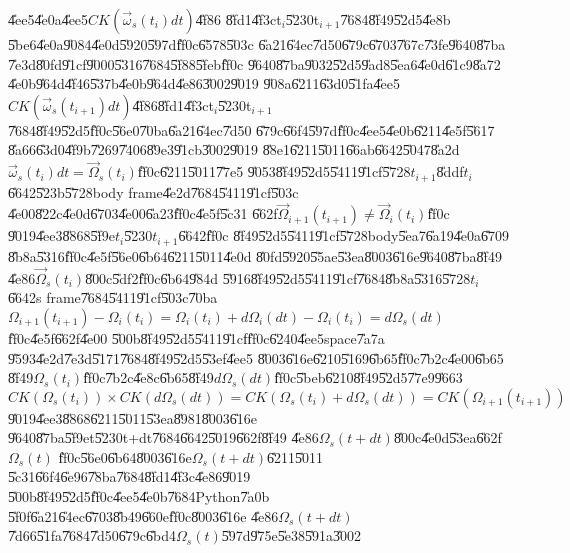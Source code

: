 \documentclass[12pt]{article}
\begin{document}
\U{4ee5}\U{4e0a}\U{4ee5}$CK\left( \vec{\omega}_{s}(t_{i})dt\right) $\U{4f86}%
\U{8fd1}\U{4f3c}t$_{i}$\U{5230}t$_{i+1}$\U{7684}\U{8f49}\U{52d5}\U{4e8b}%
\U{5be6}\U{4e0a}\U{9084}\U{4e0d}\U{5920}\U{597d}\U{ff0c}\U{6578}\U{503c}%
\U{6a21}\U{64ec}\U{7d50}\U{679c}\U{6703}\U{767c}\U{73fe}\U{9640}\U{87ba}%
\U{7e3d}\U{80fd}\U{91cf}\U{9000}\U{5316}\U{7684}\U{5f88}\U{5feb}\U{ff0c}%
\U{9640}\U{87ba}\U{9032}\U{52d5}\U{9ad8}\U{5ea6}\U{4e0d}\U{61c9}\U{8a72}%
\U{4e0b}\U{964d}\U{4f46}\U{537b}\U{4e0b}\U{964d}\U{4e86}\U{3002}\U{9019}%
\U{908a}\U{6211}\U{63d0}\U{51fa}\U{4ee5}$CK\left( \vec{\omega}%
_{s}(t_{i+1})dt\right) $\U{4f86}\U{8fd1}\U{4f3c}t$_{i}$\U{5230}t$_{i+1}$%
\U{7684}\U{8f49}\U{52d5}\U{ff0c}\U{56e0}\U{70ba}\U{6a21}\U{64ec}\U{7d50}%
\U{679c}\U{66f4}\U{597d}\U{ff0c}\U{4ee5}\U{4e0b}\U{6211}\U{4e5f}\U{5617}%
\U{8a66}\U{63d0}\U{4f9b}\U{7269}\U{7406}\U{89e3}\U{91cb}\U{3002}\U{9019}%
\U{88e1}\U{6211}\U{5011}\U{66ab}\U{6642}\U{5047}\U{8a2d}$\vec{\omega}%
_{s}(t_{i})dt=\vec{\Omega}_{s}(t_{i})$\U{ff0c}\U{6211}\U{5011}\U{77e5}%
\U{9053}\U{8f49}\U{52d5}\U{5411}\U{91cf}\U{5728}$t_{i+1}$\U{8ddf}$t_{i}$%
\U{6642}\U{523b}\U{5728}body frame\U{4e2d}\U{7684}\U{5411}\U{91cf}\U{503c}%
\U{4e00}\U{822c}\U{4e0d}\U{6703}\U{4e00}\U{6a23}\U{ff0c}\U{4e5f}\U{5c31}%
\U{662f}$\vec{\Omega}_{i+1}(t_{i+1})\neq \vec{\Omega}_{i}(t_{i})$\U{ff0c}%
\U{9019}\U{4ee3}\U{8868}\U{5f9e}$t_{i}$\U{5230}$t_{i+1}$\U{6642}\U{ff0c}%
\U{8f49}\U{52d5}\U{5411}\U{91cf}\U{5728}body\U{5ea7}\U{6a19}\U{4e0a}\U{6709}%
\U{8b8a}\U{5316}\U{ff0c}\U{4e5f}\U{56e0}\U{6b64}\U{6211}\U{5011}\U{4e0d}%
\U{80fd}\U{5920}\U{55ae}\U{53ea}\U{8003}\U{616e}\U{9640}\U{87ba}\U{8f49}%
\U{4e86}$\vec{\Omega}_{s}(t_{i})$\U{800c}\U{5df2}\U{ff0c}\U{6b64}\U{984d}%
\U{5916}\U{8f49}\U{52d5}\U{5411}\U{91cf}\U{7684}\U{8b8a}\U{5316}\U{5728}$%
t_{i}$\U{6642}s frame\U{7684}\U{5411}\U{91cf}\U{503c}\U{70ba}$\Omega
_{i+1}(t_{i+1})-\Omega _{i}(t_{i})=\Omega _{i}(t_{i})+d\Omega
_{i}(dt)-\Omega _{i}(t_{i})=d\Omega _{s}(dt)$\U{ff0c}\U{4e5f}\U{662f}\U{4e00}%
\U{500b}\U{8f49}\U{52d5}\U{5411}\U{91cf}\U{ff0c}\U{6240}\U{4ee5}space\U{7a7a}%
\U{9593}\U{4e2d}\U{7e3d}\U{5171}\U{7684}\U{8f49}\U{52d5}\U{53ef}\U{4ee5}%
\U{8003}\U{616e}\U{6210}\U{5169}\U{6b65}\U{ff0c}\U{7b2c}\U{4e00}\U{6b65}%
\U{8f49}$\Omega _{s}(t_{i})$\U{ff0c}\U{7b2c}\U{4e8c}\U{6b65}\U{8f49}$d\Omega
_{s}(dt)$\U{ff0c}\U{5beb}\U{6210}\U{8f49}\U{52d5}\U{77e9}\U{9663}%
\begin{equation}
CK(\Omega _{s}(t_{i}))\times CK(d\Omega _{s}(dt))=CK(\Omega
_{s}(t_{i})+d\Omega _{s}(dt))=CK(\Omega _{i+1}(t_{i+1}))
\end{equation}%
\U{9019}\U{4ee3}\U{8868}\U{6211}\U{5011}\U{53ea}\U{8981}\U{8003}\U{616e}%
\U{9640}\U{87ba}\U{5f9e}t\U{5230}t+dt\U{7684}\U{6642}\U{5019}\U{662f}\U{8f49}%
\U{4e86}$\Omega _{s}(t+dt)$\U{800c}\U{4e0d}\U{53ea}\U{662f}$\Omega _{s}(t)$%
\U{ff0c}\U{56e0}\U{6b64}\U{8003}\U{616e}$\Omega _{s}(t+dt)$\U{6211}\U{5011}%
\U{5c31}\U{66f4}\U{6e96}\U{78ba}\U{7684}\U{8fd1}\U{4f3c}\U{4e86}\U{9019}%
\U{500b}\U{8f49}\U{52d5}\U{ff0c}\U{4ee5}\U{4e0b}\U{7684}Python\U{7a0b}%
\U{5f0f}\U{6a21}\U{64ec}\U{6703}\U{8b49}\U{660e}\U{ff0c}\U{8003}\U{616e}%
\U{4e86}$\Omega _{s}(t+dt)$\U{7d66}\U{51fa}\U{7684}\U{7d50}\U{679c}\U{6bd4}$%
\Omega _{s}(t)$\U{597d}\U{975e}\U{5e38}\U{591a}\U{3002}
\end{document}
